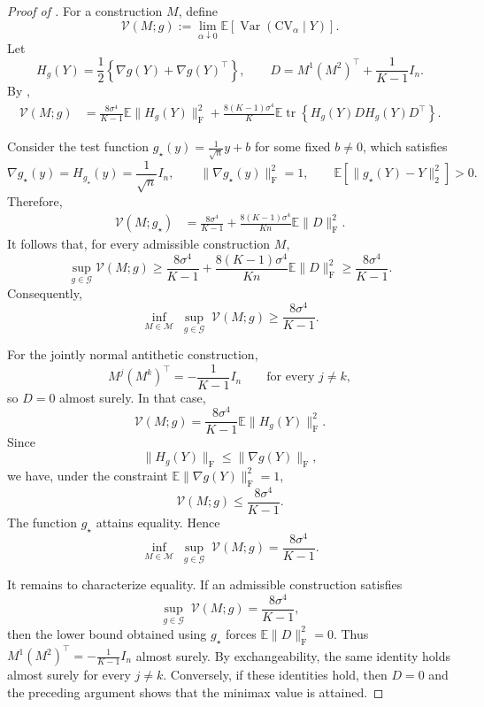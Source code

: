 \documentclass[12pt]{article}
\def\E{\mathbb{E}}
\newcommand{\tran}{^\intercal}
\theoremstyle{general}
\newcommand{\cv}{{\mathrm{CV}}}
\begin{document}
\begin{proof}[Proof of ]
For a construction $M$, define
\[
\mathcal V(M;g)
:=
\lim_{\alpha\downarrow0}
\mathbb E\!\left[
\operatorname{Var}(\cv_\alpha\mid Y)
\right].
\]
Let
\[
H_g(Y)
=
\frac12\left\{
\nabla g(Y)+\nabla g(Y)\tran
\right\},
\qquad
D
=
M^1(M^2)\tran+\frac1{K-1}I_n.
\]
By ,
\begin{align*}
\mathcal V(M;g)
&=
\frac{8\sigma^4}{K-1}
\mathbb E\|H_g(Y)\|_{\mathrm F}^2
+
\frac{8(K-1)\sigma^4}{K}
\mathbb E\operatorname{tr}
\left\{
H_g(Y)D H_g(Y)D\tran
\right\}.
\end{align*}

Consider the test function
$g_\star(y)=\frac1{\sqrt n}y+b$ for some fixed $b\neq 0$,
which satisfies
\[
\nabla g_\star(y)
=
H_{g_\star}(y)
=
\frac1{\sqrt n}I_n,
\qquad
\|\nabla g_\star(y)\|_{\mathrm F}^2=1,\qquad \E[\|g_\star(Y)-Y\|_2^2]> 0.
\]
Therefore,
\begin{align*}
\mathcal V(M;g_\star)
&=
\frac{8\sigma^4}{K-1}
+
\frac{8(K-1)\sigma^4}{Kn}
\mathbb E\|D\|_{\mathrm F}^2.
\end{align*}
It follows that, for every admissible construction $M$,
\[
\sup_{g\in\mathcal{G}}
\mathcal V(M;g)
\geq
\frac{8\sigma^4}{K-1}
+
\frac{8(K-1)\sigma^4}{Kn}
\mathbb E\|D\|_{\mathrm F}^2
\geq
\frac{8\sigma^4}{K-1}.
\]
Consequently,
\[
\inf_{M\in\mathcal{M}}\;
\sup_{g\in\mathcal{G}}\;
\mathcal V(M;g)
\geq
\frac{8\sigma^4}{K-1}.
\]

For the jointly normal antithetic construction,
\[
M^j(M^k)\tran
=
-\frac1{K-1}I_n
\qquad
\text{for every }j\neq k,
\]
so $D=0$ almost surely. In that case,
\[
\mathcal V(M;g)
=
\frac{8\sigma^4}{K-1}
\mathbb E\|H_g(Y)\|_{\mathrm F}^2.
\]
Since
\[
\|H_g(Y)\|_{\mathrm F}
\leq
\|\nabla g(Y)\|_{\mathrm F},
\]
we have, under the constraint
$\mathbb E\|\nabla g(Y)\|_{\mathrm F}^2=1$,
\[
\mathcal V(M;g)
\leq
\frac{8\sigma^4}{K-1}.
\]
The function $g_\star$ attains equality. Hence
\[
\inf_{M\in\mathcal{M}}\;
\sup_{g\in\mathcal{G}}\;
\mathcal V(M;g)
=
\frac{8\sigma^4}{K-1}.
\]

It remains to characterize equality. If an admissible construction
satisfies
\[
\sup_{g\in\mathcal{G}}\;
\mathcal V(M;g)
=
\frac{8\sigma^4}{K-1},
\]
then the lower bound obtained using $g_\star$ forces
$\mathbb E\|D\|_{\mathrm F}^2=0$.
Thus
$M^1(M^2)\tran=-\frac1{K-1}I_n$ almost surely.
By exchangeability, the same identity holds almost surely for every
$j\neq k$. Conversely, if these identities hold, then $D=0$ and the
preceding argument shows that the minimax value is attained.


\end{proof}
\end{document}
